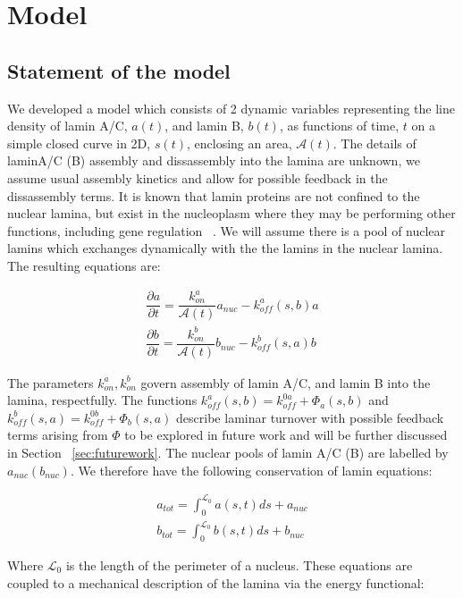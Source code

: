 \section{Model}

\subsection{Statement of the model} We developed a model which consists of 2 dynamic variables representing the line density of lamin A/C, $a(t)$, and lamin B, $b(t)$, as functions of time, $t$ on a simple closed curve in 2D, $s(t)$, enclosing an area, $\mathcal{A}(t)$. The details of laminA/C (B)  assembly and dissassembly into the lamina are unknown, we assume usual assembly kinetics and allow for possible feedback in the dissassembly terms. It is known that lamin proteins are not confined to the nuclear lamina, but exist in the nucleoplasm where they may be performing other functions, including gene regulation ~\cite{Hozak1995, Hutchison2002}. We will assume there is a pool of nuclear lamins which exchanges dynamically with the the lamins in the nuclear lamina. The resulting equations are:

\begin{align}
\dfrac{\partial a}{\partial t} = \dfrac{k_{on}^a}{\mathcal{A}(t)} a_{nuc} - k_{off}^a (s,b)a\\[7pt]
\dfrac{\partial b}{\partial t} = \dfrac{k_{on}^b}{\mathcal{A}(t)}b_{nuc} - k_{off}^b  (s,a)b \label{eq::laminaKinetics}
\end{align}

The parameters $k_{on}^a , k_{on}^b$  govern assembly of lamin A/C, and lamin B into the lamina, respectfully. The functions $k_{off}^a (s,b) = k_{off}^{0a} + \Phi_a(s,b)$ and $ k_{off}^b(s,a)  = k_{off}^{0b} + \Phi_b(s,a)$ describe laminar turnover with possible feedback terms arising from $\Phi$ to be explored in future work and will be further discussed in Section ~\ref{sec:futurework}. The nuclear pools of lamin A/C (B) are labelled by $a_{nuc} (b_{nuc})$. We therefore have the following conservation of lamin equations:

\begin{align}
a_{tot}= \int_0^{\mathcal{L}_0} a(s,t) ds + a_{nuc}\\
b_{tot} = \int_0^{\mathcal{L}_0} b(s,t) ds + b_{nuc}
\end{align}

Where $\mathcal{L}_0$ is the length of the perimeter of a nucleus.  These equations are coupled to a mechanical description of the lamina via the energy functional:


